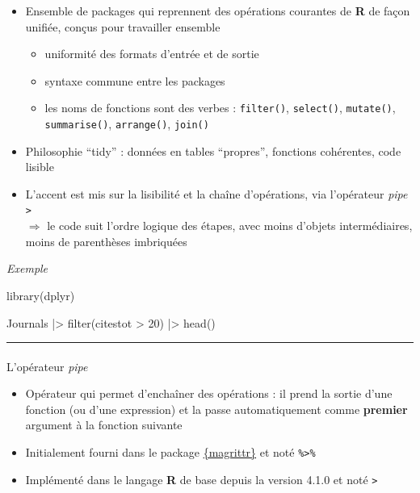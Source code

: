 \documentclass[
  french,
  10pt,
  a4paper,
]{article}
\makeatletter
\let\oldparagraph\paragraph
\renewcommand{\paragraph}{
    \@ifstar
      \xxxParagraphStar
      \xxxParagraphNoStar
  }
\newcommand{\xxxParagraphStar}[1]{\oldparagraph*{#1}\mbox{}}
\newcommand{\xxxParagraphNoStar}[1]{\oldparagraph{#1}\mbox{}}
\newenvironment{Shaded}{}{}
\newcommand{\DecValTok}[1]{\textcolor[rgb]{0.60,0.41,0.00}{#1}}
\newcommand{\FunctionTok}[1]{\textcolor[rgb]{0.25,0.47,0.95}{#1}}
\newcommand{\NormalTok}[1]{\textcolor[rgb]{0.22,0.23,0.26}{#1}}
\newcommand{\SpecialCharTok}[1]{\textcolor[rgb]{0.00,0.52,0.74}{#1}}
\providecommand{\tightlist}{%
  \setlength{\itemsep}{0pt}\setlength{\parskip}{0pt}}
\makeatother
\begin{document}
\begin{itemize}
\tightlist
\item
  Ensemble de packages qui reprennent des opérations courantes de
  \textbf{R} de façon unifiée, conçus pour travailler ensemble

  \begin{itemize}
  \tightlist
  \item
    uniformité des formats d'entrée et de sortie
  \item
    syntaxe commune entre les packages
  \item
    les noms de fonctions sont des verbes : \texttt{filter()},
    \texttt{select()}, \texttt{mutate()}, \texttt{summarise()},
    \texttt{arrange()}, \texttt{join()}
  \end{itemize}
\item
  Philosophie ``tidy'' : données en tables ``propres'', fonctions
  cohérentes, code lisible
\item
  L'accent est mis sur la lisibilité et la chaîne d'opérations, via
  l'opérateur \emph{pipe} \texttt{\textbar{}\textgreater{}}\\
  \(\Rightarrow\) le code suit l'ordre logique des étapes, avec moins
  d'objets intermédiaires, moins de parenthèses imbriquées
\end{itemize}

\emph{Exemple}

\begin{Shaded}
\begin{Highlighting}[]
\FunctionTok{library}\NormalTok{(dplyr)}

\NormalTok{Journals }\SpecialCharTok{|\textgreater{}} 
  \FunctionTok{filter}\NormalTok{(citestot }\SpecialCharTok{\textgreater{}} \DecValTok{20}\NormalTok{) }\SpecialCharTok{|\textgreater{}} 
  \FunctionTok{head}\NormalTok{()}
\end{Highlighting}
\end{Shaded}

\begin{center}\rule{0.5\linewidth}{0.5pt}\end{center}

\paragraph{\texorpdfstring{L'opérateur
\emph{pipe}}{L'opérateur pipe}}\label{lopuxe9rateur-pipe}

\begin{itemize}
\tightlist
\item
  Opérateur qui permet d'enchaîner des opérations : il prend la sortie
  d'une fonction (ou d'une expression) et la passe automatiquement comme
  \textbf{premier} argument à la fonction suivante
\item
  Initialement fourni dans le package
  \href{https://magrittr.tidyverse.org/}{\{magrittr\}} et noté
  \texttt{\%\textgreater{}\%}
\item
  Implémenté dans le langage \textbf{R} de base depuis la version 4.1.0
  et noté \texttt{\textbar{}\textgreater{}}
\end{itemize}
\end{document}
